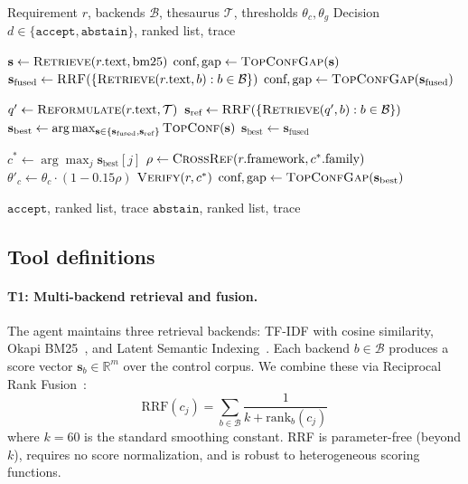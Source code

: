 \documentclass[a4paper,fleqn]{cas-sc}
\begin{document}
\begin{algorithm}[t]
\caption{RAA Reasoning Loop}
\label{alg:agent}
\begin{algorithmic}[1]
\REQUIRE Requirement $r$, backends $\mathcal{B}$, thesaurus $\mathcal{T}$, thresholds $\theta_c, \theta_g$
\ENSURE Decision $d \in \{\texttt{accept}, \texttt{abstain}\}$, ranked list, trace

\STATE $\mathbf{s} \gets \textsc{Retrieve}(r.\text{text}, \text{bm25})$ 
\STATE $\text{conf}, \text{gap} \gets \textsc{TopConfGap}(\mathbf{s})$
\STATE $\mathbf{s}_{\text{fused}} \gets \textsc{RRF}(\{\textsc{Retrieve}(r.\text{text}, b) : b \in \mathcal{B}\})$ 
\STATE $\text{conf}, \text{gap} \gets \textsc{TopConfGap}(\mathbf{s}_{\text{fused}})$

    \STATE $q' \gets \textsc{Reformulate}(r.\text{text}, \mathcal{T})$ 
    \STATE $\mathbf{s}_{\text{ref}} \gets \textsc{RRF}(\{\textsc{Retrieve}(q', b) : b \in \mathcal{B}\})$
    \STATE $\mathbf{s}_{\text{best}} \gets \arg\max_{\mathbf{s} \in \{\mathbf{s}_{\text{fused}}, \mathbf{s}_{\text{ref}}\}} \textsc{TopConf}(\mathbf{s})$
\ELSE
    \STATE $\mathbf{s}_{\text{best}} \gets \mathbf{s}_{\text{fused}}$
\ENDIF

\STATE $c^* \gets \arg\max_j \mathbf{s}_{\text{best}}[j]$
\STATE $\rho \gets \textsc{CrossRef}(r.\text{framework}, c^*.\text{family})$ 
\STATE $\theta'_c \gets \theta_c \cdot (1 - 0.15\rho)$ 
\STATE $\textsc{Verify}(r, c^*)$ 
\STATE $\text{conf}, \text{gap} \gets \textsc{TopConfGap}(\mathbf{s}_{\text{best}})$

    \RETURN $\texttt{accept}$, ranked list, trace
\ELSE
    \RETURN $\texttt{abstain}$, ranked list, trace
\ENDIF
\end{algorithmic}
\end{algorithm}


\subsection{Tool definitions}

\paragraph{T1: Multi-backend retrieval and fusion.}
The agent maintains three retrieval backends: TF-IDF with cosine similarity, Okapi BM25~\citep{Robertson2009}, and Latent Semantic Indexing~\citep{MarcusMaletic2003}.
Each backend $b \in \mathcal{B}$ produces a score vector $\mathbf{s}_b \in \mathbb{R}^m$ over the control corpus.
We combine these via Reciprocal Rank Fusion~\citep{Cormack2009}:
\begin{equation}
\text{RRF}(c_j) = \sum_{b \in \mathcal{B}} \frac{1}{k + \text{rank}_b(c_j)}
\end{equation}
where $k = 60$ is the standard smoothing constant.
RRF is parameter-free (beyond $k$), requires no score normalization, and is robust to heterogeneous scoring functions.
\end{document}
